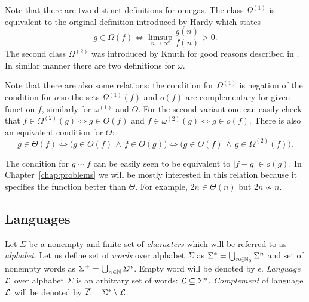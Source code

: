 		\begin{remark}
			Note that there are two distinct definitions for omegas. The class $\Omega^{(1)}$ is equivalent to the original definition introduced by Hardy \cite{hardy1914} which states
			\begin{equation*}
				g \in \Omega(f) \iff \limsup\limits_{n\to\infty}\frac{g(n)}{f(n)} > 0 .
			\end{equation*}
			The second class $\Omega^{(2)}$ was introduced by Knuth for good reasons described in \cite{knuth76}. In similar manner there are two definitions for $\omega$.
		\end{remark}
		\begin{remark}
			Note that there are also some relations: the condition for $\Omega^{(1)}$ is negation of the condition for $o$ so the sets $\Omega^{(1)}(f)$ and $o(f)$ are complementary for given function $f$, similarly for $\omega^{(1)}$ and $O$. For the second variant one can easily check that $f\in\Omega^{(2)}(g)\iff g\in O(f)$ and $f\in\omega^{(2)}(g)\iff g\in o(f)$. There is also an equivalent condition for $\Theta$:
			\begin{equation*}
				g \in \Theta(f) \iff \bigl(g \in O(f) \,\wedge\, f \in O(g)\bigr) \iff \bigl(g \in O(f) \,\wedge\, g \in \Omega^{(2)}(f)\bigr) .
			\end{equation*}
		\end{remark}
		\begin{remark}
		\label{rem:tilde}
			The condition for $g \sim f$ can be easily seen to be equivalent to $|f-g| \in o(g)$. In Chapter~\ref{chap:problems} we will be mostly interested in this relation because it specifies the function better than $\Theta$. For example, $2n \in \Theta(n)$ but $2n \not\sim n$.
		\end{remark}
	
	\subsection{Languages}
		
		\begin{defn}
			Let $\Sigma$ be a nonempty and finite set of {\em characters} which will be referred to as {\em alphabet}. Let us define set of {\em words} over alphabet $\Sigma$ as $\Sigma^* = \bigcup_{n\in\mathbb{N}_0}\Sigma^n$ and set of nonempty words as $\Sigma^+ = \bigcup_{n\in\mathbb{N}}\Sigma^n$. Empty word will be denoted by $\epsilon$. {\em Language} ${\cal L}$ over alphabet $\Sigma$ is an arbitrary set of words: ${\cal L} \subseteq \Sigma^*$. {\em Complement} of language $\cal L$ will be denoted by ${\cal\overline L} = \Sigma^* \setminus {\cal L}$.
		\end{defn}
		

